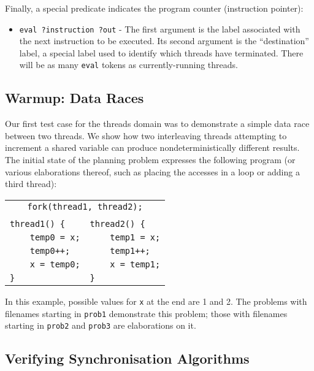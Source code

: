 Finally, a special predicate indicates the program counter (instruction pointer):
\begin{itemize}
	\item \texttt{eval ?instruction ?out} - The first argument is the label associated with the next instruction to be executed. Its second argument is the ``destination'' label, a special label used to identify which threads have terminated. There will be as many \texttt{eval} tokens as currently-running threads.
\end{itemize}

\subsection{Warmup: Data Races}

Our first test case for the threads domain was to demonstrate a simple data race between two threads. We show how two interleaving threads attempting to increment a shared variable can produce nondeterministically different results. The initial state of the planning problem expresses the following program (or various elaborations thereof, such as placing the accesses in a loop or adding a third thread):

	\begin{center}
	\begin{tabular}{ll}
	\multicolumn{2}{c}{\texttt{fork(thread1, thread2);}} \\
	& \\
	\texttt{thread1() \{} & \texttt{thread2() \{} \\
	\texttt{~~~~temp0 = x;\qquad} & \texttt{~~~~temp1 = x;} \\
	\texttt{~~~~temp0++;} & \texttt{~~~~temp1++;} \\
	\texttt{~~~~x = temp0;} & \texttt{~~~~x = temp1;} \\
	\texttt{\}} & \texttt{\}} \\
	\end{tabular}
	\end{center}

In this example, possible values for \texttt{x} at the end are 1 and 2. The problems with filenames starting in \texttt{prob1} demonstrate this problem; those with filenames starting in \texttt{prob2} and \texttt{prob3} are elaborations on it.

\subsection{Verifying Synchronisation Algorithms}

